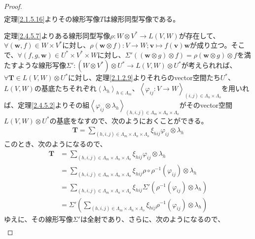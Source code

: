 \documentclass[dvipdfmx]{jsarticle}
\begin{document}
\begin{proof}
\begin{align*}
\end{align*}
定理\ref{2.1.5.16}よりその線形写像$T$は線形同型写像である。\par
定理\ref{2.4.5.7}よりある線形同型写像$\rho:W \otimes V^{*} \rightarrow L(V,W)$が存在して、$\forall\left( \mathbf{w},f \right) \in W \times V^{*}$に対し、$\rho\left( \mathbf{w} \otimes f \right):V \rightarrow W;\mathbf{v} \mapsto f\left( \mathbf{v} \right)\mathbf{w}$が成り立つ。そこで、$\forall\left( f,g,\mathbf{w} \right) \in U^{*} \times V^{*} \times W$に対し、$\varSigma'\left( \left( \mathbf{w} \otimes g \right) \otimes f \right) = \rho\left( \mathbf{w} \otimes g \right) \otimes f$を満たすような線形写像$\varSigma':\left( W \otimes V^{*} \right) \otimes U^{*} \rightarrow L(V,W) \otimes U^{*}$が考えられれば、$\forall\mathbf{T} \in L(V,W) \otimes U^{*}$に対し、定理\ref{2.1.2.9}よりそれらのvector空間たち$U^{*}$、$L(V,W)$の基底たちそれぞれ$\left\langle \lambda_{h} \right\rangle_{h \in \varLambda_{m}}$、$\left\langle \varphi_{ij}:V \rightarrow W \right\rangle_{(i,j) \in \varLambda_{n} \times \varLambda_{o}}$を用いれば、定理\ref{2.4.5.2}よりその組$\left\langle \varphi_{ij} \otimes \lambda_{h} \right\rangle_{(h,i,j) \in \varLambda_{m} \times \varLambda_{n} \times \varLambda_{o}}$がそのvector空間$L(V,W) \otimes U^{*}$の基底をなすので、次のようにおくことができる。
\begin{align*}
\mathbf{T} = \sum_{(h,i,j) \in \varLambda_{m} \times \varLambda_{n} \times \varLambda_{o}} {\xi_{hij}\varphi_{ij} \otimes \lambda_{h}}
\end{align*}
このとき、次のようになるので、
\begin{align*}
\mathbf{T} &= \sum_{(h,i,j) \in \varLambda_{m} \times \varLambda_{n} \times \varLambda_{o}} {\xi_{hij}\varphi_{ij} \otimes \lambda_{h}}\\
&= \sum_{(h,i,j) \in \varLambda_{m} \times \varLambda_{n} \times \varLambda_{o}} {\xi_{hij}\rho \circ \rho^{- 1}\left( \varphi_{ij} \right) \otimes \lambda_{h}}\\
&= \sum_{(h,i,j) \in \varLambda_{m} \times \varLambda_{n} \times \varLambda_{o}} {\xi_{hij}\varSigma'\left( \rho^{- 1}\left( \varphi_{ij} \right) \otimes \lambda_{h} \right)}\\
&= \varSigma'\left( \sum_{(h,i,j) \in \varLambda_{m} \times \varLambda_{n} \times \varLambda_{o}} {\xi_{hij}\rho^{- 1}\left( \varphi_{ij} \right) \otimes \lambda_{h}} \right)
\end{align*}
ゆえに、その線形写像$\varSigma'$は全射であり、さらに、次のようになるので、
\begin{align*}

\end{align*}
\end{proof}
\end{document}
